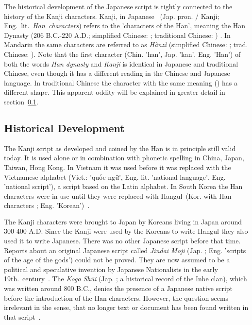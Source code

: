 The historical development of the Japanese script is tightly connected to the 
history of the Kanji characters. Kanji, in Japanese 
~(Jap. pron.  / Kanji; Eng.~lit.~\emph{Han~characters}) 
refers to the 'characters of the Han', meaning the Han Dynasty 
(206 B.C.-220 A.D.; simplified Chinese: ; traditional Chinese: 
) . In Mandarin the same characters are 
referred to as \emph{Hànzì} (simplified Chinese: ; 
trad. Chinese: ).
Note that the first character  (Chin. 'han', Jap. 'kan', Eng. 'Han') 
of both the words \emph{Han dynasty} and \emph{Kanji} is identical in Japanese 
and traditional Chinese, even though it has a different reading in the 
Chinese and Japanese language. In traditional Chinese the character with
the same meaning () has a different shape. This apparent oddity will be 
explained in greater detail in 
section~\ref{sec:historicaldevelopmentofjapanesescript}.

\subsection{Historical Development}
\label{sec:historicaldevelopmentofjapanesescript}

The Kanji script as developed and coined by the Han is in principle still valid 
today. It is used alone or in combination with phonetic spelling in China, Japan,
Taiwan, Hong Kong. In Vietnam it was used before it was replaced with the 
Vietnamese alphabet (Viet.: 'quốc ngữ', Eng. lit. 'national language', Eng. 
'national script'), a script based on the Latin alphabet. In South Korea the Han 
characters were in use until they were replaced with 
Hangul~(Kor. with Han characters ; Eng. 'Korean')~.

The Kanji characters were brought to Japan by Koreans living in Japan around 
300-400 A.D. Since the Kanji were used by the Koreans to write 
Hangul they also used it to write Japanese. There was no other Japanese script 
before that time. Reports about an original Japanese script called 
\emph{Jindai Moji} (Jap. ; Eng. 'scripts of the age of the gods')
could not be proved. They are now assumed to be a political and speculative 
invention by Japanese Nationalists in the early 
19th.~century~. The \emph{Kogo Shūi} 
(Jap. ; a historical record of the Inbe clan),
which was written around 800 B.C., denies the presence of a Japanese native
script before the introduction of the Han characters. However, the question
seems irrelevant in the sense, that no longer text or document has been found
written in that script~.

